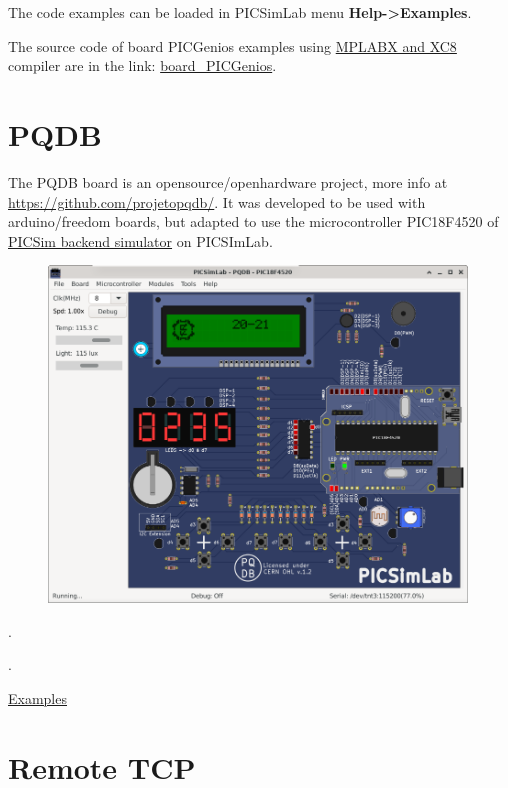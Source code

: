 The code examples can be loaded in PICSimLab menu \textbf{Help->Examples}.

The source code of board PICGenios examples using 
\href{http://www.microchip.com/mplabx}{MPLABX and XC8} compiler are in the link: 
\href{https://lcgamboa.github.io/picsimlab_examples/board_PICGenios.html}{board\_PICGenios}.


\section{PQDB}

The PQDB board is an opensource/openhardware project, more info at \href{https://github.com/projetopqdb/}{https://github.com/projetopqdb/}.
It was developed to be used with arduino/freedom boards, but adapted to use the microcontroller PIC18F4520 of 
\hyperlink{def:PICSim}{PICSim backend simulator} on PICSImLab.

\begin{figure}[H]
\center
\includegraphics[width=0.99\textwidth]{img/board_PQDB.png} 
\end{figure} 

.\vspace{0.5cm}

.\vspace{0.5cm}


\href{https://lcgamboa.github.io/picsimlab_examples/board_PQDB.html}{Examples}

\section{Remote TCP}

